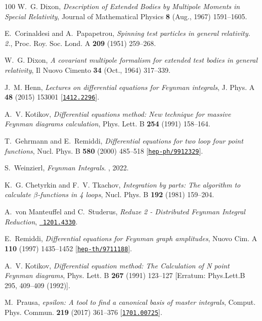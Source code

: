 \begin{thebibliography}{100}
W.~G. {Dixon},  {\em {Description of Extended Bodies by Multipole Moments in
  Special Relativity}}, Journal of Mathematical Physics {\bf 8} (Aug., 1967)
  1591--1605.

E.~Corinaldesi and A.~Papapetrou,  {\em {Spinning test particles in general
  relativity. 2.}}, Proc. Roy. Soc. Lond. A {\bf 209} (1951) 259--268.

W.~G. {Dixon},  {\em {A covariant multipole formalism for extended test bodies
  in general relativity}}, Il Nuovo Cimento {\bf 34} (Oct., 1964) 317--339.

J.~M. Henn,  {\em {Lectures on differential equations for Feynman integrals}},
  J. Phys. A {\bf 48} (2015) 153001
  [\href{http://www.arXiv.org/abs/1412.2296}{{\tt 1412.2296}}].

A.~V. Kotikov,  {\em {Differential equations method: New technique for massive
  Feynman diagrams calculation}}, Phys. Lett. B {\bf 254} (1991) 158--164.

T.~Gehrmann and E.~Remiddi,  {\em {Differential equations for two loop four
  point functions}}, Nucl. Phys. B {\bf 580} (2000) 485--518
  [\href{http://www.arXiv.org/abs/hep-ph/9912329}{{\tt hep-ph/9912329}}].

S.~Weinzierl, {\em {Feynman Integrals}}.
, 2022.

K.~G. Chetyrkin and F.~V. Tkachov,  {\em {Integration by parts: The algorithm
  to calculate $\beta$-functions in 4 loops}}, Nucl. Phys. B {\bf 192} (1981)
  159--204.

A.~von Manteuffel and C.~Studerus,  {\em {Reduze 2 - Distributed Feynman
  Integral Reduction}}, \href{http://www.arXiv.org/abs/1201.4330}{{\tt
  1201.4330}}.

E.~Remiddi,  {\em {Differential equations for Feynman graph amplitudes}}, Nuovo
  Cim. A {\bf 110} (1997) 1435--1452
  [\href{http://www.arXiv.org/abs/hep-th/9711188}{{\tt hep-th/9711188}}].

A.~V. Kotikov,  {\em {Differential equation method: The Calculation of N point
  Feynman diagrams}}, Phys. Lett. B {\bf 267} (1991) 123--127 [Erratum:
  Phys.Lett.B 295, 409--409 (1992)].

M.~Prausa,  {\em {epsilon: A tool to find a canonical basis of master
  integrals}}, Comput. Phys. Commun. {\bf 219} (2017) 361--376
  [\href{http://www.arXiv.org/abs/1701.00725}{{\tt 1701.00725}}].


\end{thebibliography}
